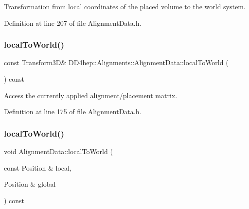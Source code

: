 Transformation from local coordinates of the placed volume to the world system. 



Definition at line 207 of file Alignment\+Data.\+h.

\hypertarget{class_d_d4hep_1_1_alignments_1_1_alignment_data_af24ecc77fdd725d3ab6a76848594fa95}{}\label{class_d_d4hep_1_1_alignments_1_1_alignment_data_af24ecc77fdd725d3ab6a76848594fa95} 
\subsubsection{\texorpdfstring{local\+To\+World()}{localToWorld()}\hspace{0.1cm}{\footnotesize\ttfamily [1/5]}}
{\footnotesize\ttfamily const Transform3D\& D\+D4hep\+::\+Alignments\+::\+Alignment\+Data\+::local\+To\+World (\begin{DoxyParamCaption}{ }\end{DoxyParamCaption}) const\hspace{0.3cm}{\ttfamily [inline]}}



Access the currently applied alignment/placement matrix. 



Definition at line 175 of file Alignment\+Data.\+h.

\hypertarget{class_d_d4hep_1_1_alignments_1_1_alignment_data_a7e4879bde9e295fcfeb209c9dd721691}{}\label{class_d_d4hep_1_1_alignments_1_1_alignment_data_a7e4879bde9e295fcfeb209c9dd721691} 
\subsubsection{\texorpdfstring{local\+To\+World()}{localToWorld()}\hspace{0.1cm}{\footnotesize\ttfamily [2/5]}}
{\footnotesize\ttfamily void Alignment\+Data\+::local\+To\+World (\begin{DoxyParamCaption}\item[{const Position \&}]{local,  }\item[{Position \&}]{global }\end{DoxyParamCaption}) const}



